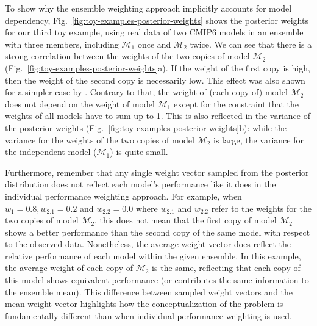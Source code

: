 To show why the ensemble weighting approach implicitly accounts for model dependency, Fig.~\ref{fig:toy-examples-posterior-weights} shows the posterior weights for our third toy example, using real data of two CMIP6 models in an ensemble with three members, including $\mathcal{M}_1$ once and $\mathcal{M}_2$ twice. 
We can see that there is a strong correlation between the weights of the two copies of model $\mathcal{M}_2$ (Fig.~\ref{fig:toy-examples-posterior-weights}a).
If the weight of the first copy is high, then the weight of the second copy is necessarily low. 
This effect was also shown for a simpler case by \citet{massoudBayesianModelAveraging2020}.
Contrary to that, the weight of (each copy of) model $\mathcal{M}_2$ does not depend on the weight of model $\mathcal{M}_1$ except for the constraint that the weights of all models have to sum up to 1.
This is also reflected in the variance of the posterior weights (Fig.~\ref{fig:toy-examples-posterior-weights}b): while the variance for the weights of the two copies of model $\mathcal{M}_2$ is large, the variance for the independent model ($\mathcal{M}_1$) is quite small.

Furthermore, remember that any single weight vector sampled from the posterior distribution does not reflect each model's performance like it does in the individual performance weighting approach. For example, when $w_1 = 0.8, w_{2.1}=0.2$ and $w_{2.2}=0.0$ where $w_{2.1}$ and $w_{2.2}$ refer to the weights for the two copies of model $\mathcal{M}_2$, this does not mean that the first copy of model $\mathcal{M}_2$ shows a better performance than the second copy of the same model with respect to the observed data. Nonetheless, the average weight vector does reflect the relative performance of each model within the given ensemble. In this example, the average weight of each copy of $\mathcal{M}_2$ is the same, reflecting that each copy of this model shows equivalent performance (or contributes the same information to the ensemble mean). This difference between sampled weight vectors and the mean weight vector highlights how the conceptualization of the problem is fundamentally different than when individual performance weighting is used.

